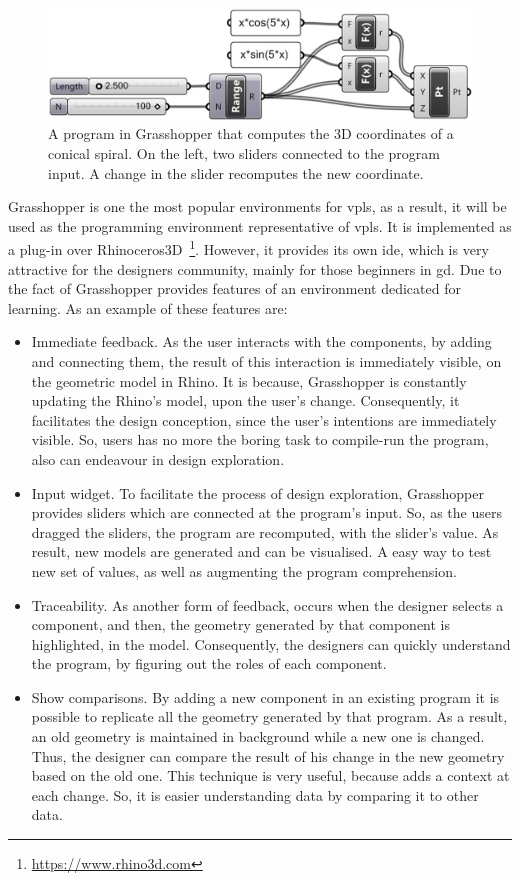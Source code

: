 \begin{figure}[!htbp]
  \centering
  \includegraphics[scale=0.15]{img/grasshopper}
    \caption{A program in Grasshopper that computes the 3D coordinates of a conical spiral. On the left, two sliders connected to the program input. A change in the slider recomputes the new coordinate.}
  \label{fig:grass}
\end{figure}

Grasshopper is one the most popular environments for \ac{vpls}, as a result, it will be used as the programming environment representative of \ac{vpls}. It is implemented as a plug-in over Rhinoceros3D~\footnote{\url{https://www.rhino3d.com}}. However, it provides its own \ac{ide}, which is very attractive for the designers community, mainly for those beginners in \ac{gd}. Due to the fact of Grasshopper provides features of an environment dedicated for learning. As an example of these features are: 

\begin{itemize}
 \item Immediate feedback. As the user interacts with the components, by adding and connecting them, the result of this interaction is immediately visible, on the geometric model in Rhino.  It is because, Grasshopper is constantly updating the Rhino's model, upon the user's change. Consequently, it facilitates the design conception, since the user's intentions are immediately visible. So, users has no more the boring task to compile-run the program, also can endeavour in design exploration.
 \item Input widget. To facilitate the process of design exploration, Grasshopper provides sliders which are connected at the program's input. So, as the users dragged the sliders, the program are recomputed, with the slider's value. As result, new models are generated and can be visualised. A easy way to test new set of values, as well as augmenting the program comprehension.
 \item Traceability. As another form of feedback, occurs when the designer selects a component, and then, the geometry generated by that component is highlighted, in the model. Consequently, the designers can quickly understand the program, by figuring out the roles of each component.
 \item Show comparisons. By adding a new component in an existing program it is possible to replicate all the geometry generated by that program. As a result, an old geometry is maintained in background while a new one is changed. Thus, the designer can compare the result of his change in the new geometry based on the old one. This technique is very useful, because adds a context at each change. So, it is easier understanding data by comparing it to other data.
\end{itemize}

